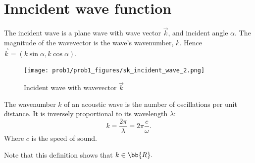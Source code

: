     \section{Inncident wave function}
The incident wave is a plane wave with wave vector $\vec{k}$, and incident angle $\alpha$. The magnitude of the wavevector is the wave's wavenumber, $k$. Hence $\vec{k} = (k \sin\alpha, k \cos\alpha)$.
    \begin{figure}  %
        \centering
        \texttt{[image: prob1/prob1\_figures/sk\_incident\_wave\_2.png]}
        \caption{Incident wave with wavevector $\vec{k}$}
        \label{fig:incident_wave}
    \end{figure}

    \begin{defn}    %
    The wavenumber $k$ of an acoustic wave is the number of oscillations per unit distance. It is inversely proportional to its wavelength $\lambda$:
    \[
    k = \frac{2 \pi}{ \lambda} = 2 \pi \frac{c}{\omega}.
    \]
    Where $c$ is the speed of sound. 
    \end{defn}
Note that this definition shows that $k \in \bb{R}.$

